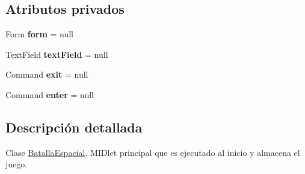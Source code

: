 \subsection*{Atributos privados}
\begin{DoxyCompactItemize}
\item 
\hypertarget{classBatallaEspacial_1_1BatallaEspacial_a1de64d33780230df491d314fbfdca052}{
Form {\bfseries form} = null}
\label{classBatallaEspacial_1_1BatallaEspacial_a1de64d33780230df491d314fbfdca052}

\item 
\hypertarget{classBatallaEspacial_1_1BatallaEspacial_aaf203e8b6c1e94c161b855c60e5c1bf4}{
TextField {\bfseries textField} = null}
\label{classBatallaEspacial_1_1BatallaEspacial_aaf203e8b6c1e94c161b855c60e5c1bf4}

\item 
\hypertarget{classBatallaEspacial_1_1BatallaEspacial_a4576c2afa533388ff6e240abf3f5fbc7}{
Command {\bfseries exit} = null}
\label{classBatallaEspacial_1_1BatallaEspacial_a4576c2afa533388ff6e240abf3f5fbc7}

\item 
\hypertarget{classBatallaEspacial_1_1BatallaEspacial_a0199ad4917943181896bc19f9267201a}{
Command {\bfseries enter} = null}
\label{classBatallaEspacial_1_1BatallaEspacial_a0199ad4917943181896bc19f9267201a}

\end{DoxyCompactItemize}


\subsection{Descripción detallada}
Clase \hyperlink{classBatallaEspacial_1_1BatallaEspacial}{BatallaEspacial}. MIDlet principal que es ejecutado al inicio y almacena el juego. 

